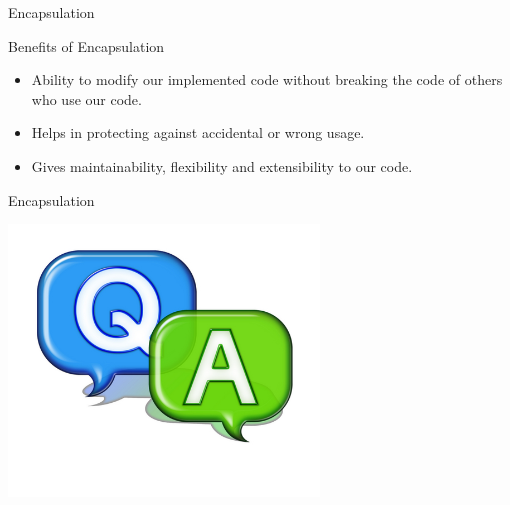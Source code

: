 \documentclass[14pt]{beamer}
\begin{document}
\begin{frame}{Encapsulation}
\begin{block}{}
Benefits of Encapsulation
\end{block}
\begin{itemize}
\item Ability to modify our implemented code without breaking the code of others who use our code.
\item Helps in protecting against accidental or wrong usage.
\item Gives maintainability, flexibility and extensibility to our code.
\end{itemize}

\end{frame}
\begin{frame}{Encapsulation}
\begin{center}
\includegraphics[scale=0.5]{COJ-M01-S05-Image5.png}
\end{center}
\end{frame}
\end{document}
